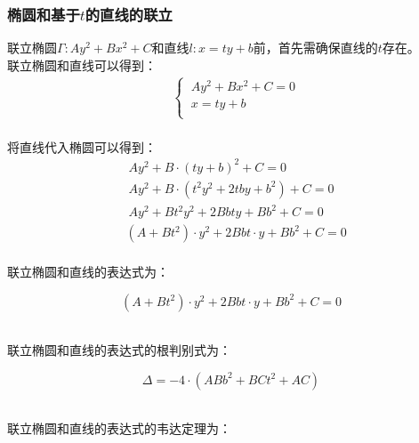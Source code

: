 \documentclass[UTF8]{ctexart}
\begin{document}
\newpage

\subsubsection{椭圆和基于$t$的直线的联立}
    \setcounter{equation}{0}
    联立椭圆$\Gamma:Ay^2+Bx^2+C$和直线$l:x=ty+b$前，首先需确保直线的$t$存在。\\[3mm]
    联立椭圆和直线可以得到：
    \begin{align}
        &\begin{cases}
            ~Ay^2+Bx^2+C=0\\[1mm]
            ~x=ty+b\\[1mm]
        \end{cases}
    \end{align}\\[1mm]
    将直线代入椭圆可以得到：
    \begin{align}
        &~Ay^2+B\cdot(ty+b)^2+C=0\\[5mm]
        &~Ay^2+B\cdot\left(t^2y^2+2tby+b^2\right)+C=0\\[5mm]
        &~Ay^2+Bt^2y^2+2Bbty+Bb^2+C=0\\[5mm]
        &\left(A+Bt^2\right)\cdot y^2+2Bbt\cdot y+Bb^2+C=0
    \end{align}\\
    联立椭圆和直线的表达式为：
    \begin{large}
        \begin{equation*}
            \left(A+Bt^2\right)\cdot y^2+2Bbt\cdot y+Bb^2+C=0
        \end{equation*}
    \end{large}\\
    联立椭圆和直线的表达式的根判别式为：
    \begin{large}
        \begin{equation*}
            \Delta=-4\cdot\left(ABb^2+BCt^2+AC\right)
        \end{equation*}
    \end{large}\\
    联立椭圆和直线的表达式的韦达定理为：\vspace{8pt}
\end{document}
